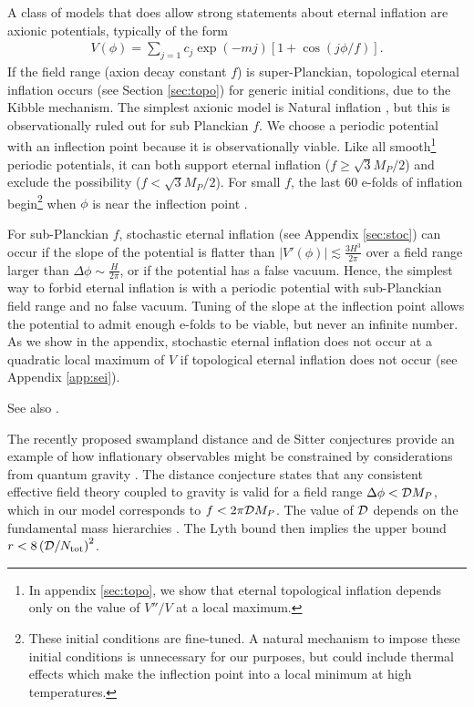 \documentclass[aps,amsfonts,amsmath,prd,preprint,nofootinbib,superscriptaddress]{revtex4}
\newcommand{\Mp}{{M_{P}}}
\begin{document}
A class of models that does allow strong statements about eternal inflation are axionic potentials, typically of the form \cite{shiu}
\begin{align}
V(\phi) = \sum_{j=1} c_j \exp(- m j)\left[1 + \cos(j\phi/f)\right].
\end{align}
If the field range (axion decay constant $f$) is super-Planckian, topological 
eternal inflation \cite{Vilenkin:1994pv,Linde:1994wt} occurs (see Section \ref{sec:topo}) for generic initial conditions, due to the Kibble mechanism.  
The simplest axionic model is Natural inflation \cite{freese}, but this is observationally ruled out for sub Planckian $f$.
We choose a periodic potential with an inflection point  because it is observationally viable.  
Like all smooth\footnote{In appendix \ref{sec:topo}, we show that eternal topological inflation depends only on the value of $V''/V$ at a local maximum.} periodic potentials, it can both support eternal inflation ($f \geq \sqrt{3}\Mp/2$) and exclude the possibility ($f < \sqrt{3}\Mp/2$).  
For small $f$, the last $60$ e-folds of inflation begin\footnote{
	These initial conditions are fine-tuned.  A natural mechanism to impose these initial conditions is unnecessary for our purposes, but could 
	include thermal effects which make the inflection point into a local minimum at high temperatures.}
when $\phi$ is near the inflection point \cite{Martin:2013tda, Allahverdi:2008bt, Hotchkiss:2011am,Musoke:2017frr}.



For sub-Planckian $f$, stochastic 
eternal inflation (see Appendix \ref{sec:stoc}) can occur if 
the slope of the potential is flatter than $\left|V'(\phi)\right| \lesssim \frac{3H^3}{2\pi}$ over a field range larger 
than $\Delta\phi \sim \frac{H}{2\pi}$, or if the potential has a false vacuum.
Hence, the simplest way to forbid eternal inflation is with a periodic potential
with sub-Planckian field range and no false vacuum.  Tuning of the slope at the inflection point allows the potential to admit 
enough e-folds to be viable, but never an infinite number.  As we show in the appendix, stochastic eternal inflation does not occur at a quadratic
local maximum of $V$ if topological eternal inflation does not occur (see Appendix \ref{app:sei}).




See also \cite{Guth:1985ya}.


The recently proposed swampland distance and de Sitter conjectures provide an example of how inflationary observables might be 
constrained by considerations from quantum gravity \cite{Brown:2015iha}.  The distance conjecture
states that any consistent effective field theory coupled to gravity is valid for a field range $\Delta\phi < {\cal D}\Mp$, which in our 
model corresponds to $f < 2\pi {\cal D}\Mp$.  The value of ${\cal D}$ depends on
the fundamental mass hierarchies \cite{Dias:2018ngv}.  The Lyth bound \cite{} then implies the upper bound $r < 8\left({\cal D}/N_{\rm tot}\right)^2$.
\end{document}
